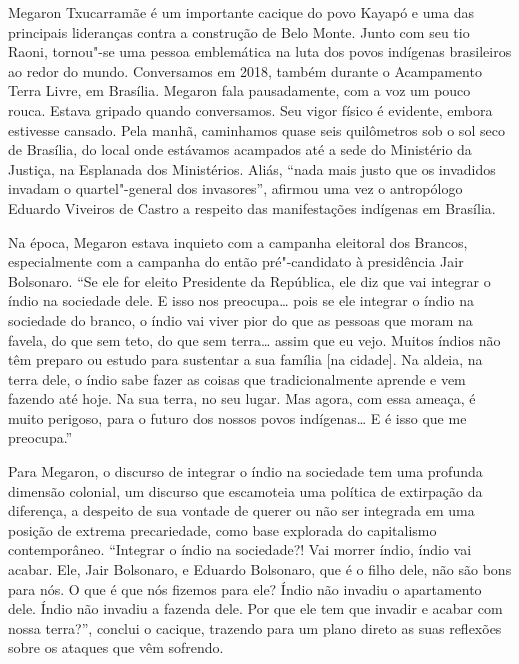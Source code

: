 Megaron Txucarramãe é um importante cacique do povo Kayapó e uma das
principais lideranças contra a construção de Belo Monte. Junto com seu
tio Raoni, tornou"-se uma pessoa emblemática na luta dos povos indígenas
brasileiros ao redor do mundo. Conversamos em 2018, também durante o
Acampamento Terra Livre, em Brasília. Megaron fala pausadamente, com a
voz um pouco rouca. Estava gripado quando conversamos. Seu vigor físico
é evidente, embora estivesse cansado. Pela manhã, caminhamos quase seis
quilômetros sob o sol seco de Brasília, do local onde estávamos
acampados até a sede do Ministério da Justiça, na Esplanada dos
Ministérios. Aliás, ``nada mais justo que os invadidos invadam o
quartel"-general dos invasores'', afirmou uma vez o antropólogo Eduardo
Viveiros de Castro a respeito das manifestações indígenas em Brasília.

Na época, Megaron estava inquieto com a campanha eleitoral dos Brancos,
especialmente com a campanha do então pré"-candidato à presidência Jair
Bolsonaro. ``Se ele for eleito Presidente da República, ele diz que vai
integrar o índio na sociedade dele. E isso nos preocupa\ldots{} pois se
ele integrar o índio na sociedade do branco, o índio vai viver pior do
que as pessoas que moram na favela, do que sem teto, do que sem
terra\ldots{} assim que eu vejo. Muitos índios não têm preparo ou estudo
para sustentar a sua família {[}na cidade{]}. Na aldeia, na terra dele,
o índio sabe fazer as coisas que tradicionalmente aprende e vem fazendo
até hoje. Na sua terra, no seu lugar. Mas agora, com essa ameaça, é
muito perigoso, para o futuro dos nossos povos indígenas\ldots{} E é
isso que me preocupa.''

Para Megaron, o discurso de integrar o índio na sociedade tem uma
profunda dimensão colonial, um discurso que escamoteia uma política de
extirpação da diferença, a despeito de sua vontade de querer ou não ser
integrada em uma posição de extrema precariedade, como base explorada do
capitalismo contemporâneo. ``Integrar o índio na sociedade?! Vai morrer
índio, índio vai acabar. Ele, Jair Bolsonaro, e Eduardo Bolsonaro, que é
o filho dele, não são bons para nós. O que é que nós fizemos para ele?
Índio não invadiu o apartamento dele. Índio não invadiu a fazenda dele.
Por que ele tem que invadir e acabar com nossa terra?'', conclui o
cacique, trazendo para um plano direto as suas reflexões sobre os
ataques que vêm sofrendo.

